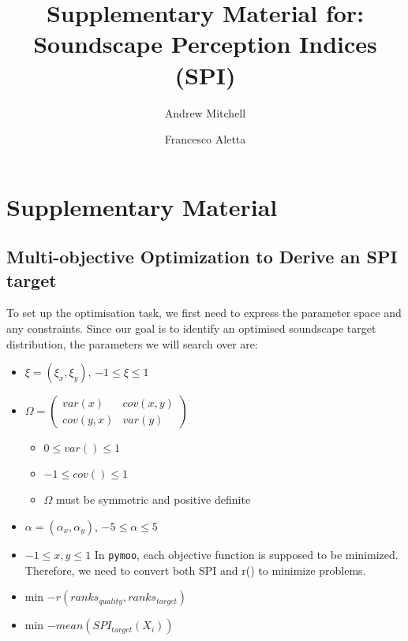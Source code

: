 \documentclass[
  authoryear,
  preprint,
  3p]{elsarticle}
\providecommand{\tightlist}{%
  \setlength{\itemsep}{0pt}\setlength{\parskip}{0pt}}\usepackage{longtable,booktabs,array}
\renewcommand*\contentsname{Table of contents}
\newcommand\contentsname{Table of contents}
\begin{document}
\begin{frontmatter}
\title{Supplementary Material for: Soundscape Perception Indices (SPI)}
\author[1]{Andrew Mitchell%
%
}
\author[1]{Francesco Aletta%
%
}




        





\end{frontmatter}
    
\renewcommand*\contentsname{Table of contents}
{
\hypersetup{linkcolor=}
\setcounter{tocdepth}{3}
\tableofcontents
}

\section{Supplementary Material}\label{supplementary-material}

\subsection{Multi-objective Optimization to Derive an SPI
target}\label{multi-objective-optimization-to-derive-an-spi-target}

To set up the optimisation task, we first need to express the parameter
space and any constraints. Since our goal is to identify an optimised
soundscape target distribution, the parameters we will search over are:

\begin{itemize}
\item
  \(\xi = (\xi_x, \xi_y)\), \(-1 \leq \xi \leq 1\)
\item
  \(\Omega = \begin{pmatrix} var(x) & cov(x, y) \\ cov(y, x) & var(y) \end{pmatrix}\)

  \begin{itemize}
  \tightlist
  \item
    \(0 \leq var() \leq 1\)
  \item
    \(-1 \leq cov() \leq 1\)
  \item
    \(\Omega\) must be symmetric and positive definite
  \end{itemize}
\item
  \(\alpha = (\alpha_x, \alpha_y)\), \(-5 \leq \alpha \leq 5\)
\item
  \(-1 \leq x, y \leq 1\) In \texttt{pymoo}, each objective function is
  supposed to be minimized. Therefore, we need to convert both SPI and
  r() to minimize problems.
\item
  min \(-r(ranks_{quality}, ranks_{target})\)
\item
  min \(-mean(SPI_{target}(X_i))\)
\end{itemize}
\end{document}
